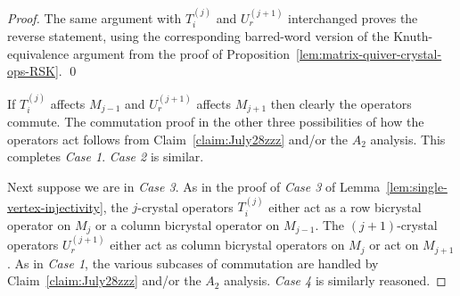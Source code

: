 \documentclass[12pt]{amsart}
\theoremstyle{definition}
\theoremstyle{remark}
\begin{document}
\begin{proof}
The same argument with $T_i^{(j)}$ and $U_r^{(j+1)}$
interchanged proves the reverse statement, using the corresponding
barred-word version of the Knuth-equivalence argument from the proof
of Proposition~\ref{lem:matrix-quiver-crystal-ops-RSK}.
\qed

If $T_i^{(j)}$ affects $M_{j-1}$ and $U_{r}^{(j+1)}$ affects $M_{j+1}$ then clearly the operators commute.
The commutation proof in the other three possibilities of how the operators act follows from Claim~\ref{claim:July28zzz} and/or 
the $A_2$ analysis. This completes  \emph{Case 1}. \emph{Case 2} is similar.

Next suppose we are in \emph{Case 3}. As in the proof of \emph{Case 3} of 
Lemma~\ref{lem:single-vertex-injectivity}, the $j$-crystal operators $T_i^{(j)}$ either act as a row bicrystal
operator on $M_j$ or a column bicrystal operator on $M_{j-1}$. The $(j+1)$-crystal operators $U_{r}^{(j+1)}$
either act as column bicrystal operators on $M_j$ or act on $M_{j+1}$. As in \emph{Case 1}, the various subcases
of commutation are handled by Claim~\ref{claim:July28zzz} and/or the $A_2$ analysis. \emph{Case 4} is similarly reasoned.
\end{proof}
\end{document}
